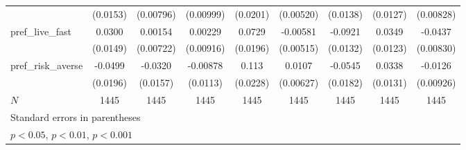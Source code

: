 {\begin{tabular}{l*{8}{c}}
            &    (0.0153)         &   (0.00796)         &   (0.00999)         &    (0.0201)         &   (0.00520)         &    (0.0138)         &    (0.0127)         &   (0.00828)         \\
[1em]
pref\_live\_fast&      0.0300\sym{*}  &     0.00154         &     0.00229         &      0.0729\sym{***}&    -0.00581         &     -0.0921\sym{***}&      0.0349\sym{**} &     -0.0437\sym{***}\\
            &    (0.0149)         &   (0.00722)         &   (0.00916)         &    (0.0196)         &   (0.00515)         &    (0.0132)         &    (0.0123)         &   (0.00830)         \\
[1em]
pref\_risk\_averse&     -0.0499\sym{*}  &     -0.0320\sym{*}  &    -0.00878         &       0.113\sym{***}&      0.0107         &     -0.0545\sym{**} &      0.0338\sym{**} &     -0.0126         \\
            &    (0.0196)         &    (0.0157)         &    (0.0113)         &    (0.0228)         &   (0.00627)         &    (0.0182)         &    (0.0131)         &   (0.00926)         \\
\hline
\(N\)       &        1445         &        1445         &        1445         &        1445         &        1445         &        1445         &        1445         &        1445         \\
\hline\hline
\multicolumn{9}{l}{\footnotesize Standard errors in parentheses}\\
\multicolumn{9}{l}{\footnotesize \sym{*} \(p<0.05\), \sym{**} \(p<0.01\), \sym{***} \(p<0.001\)}\\
\end{tabular}
}
